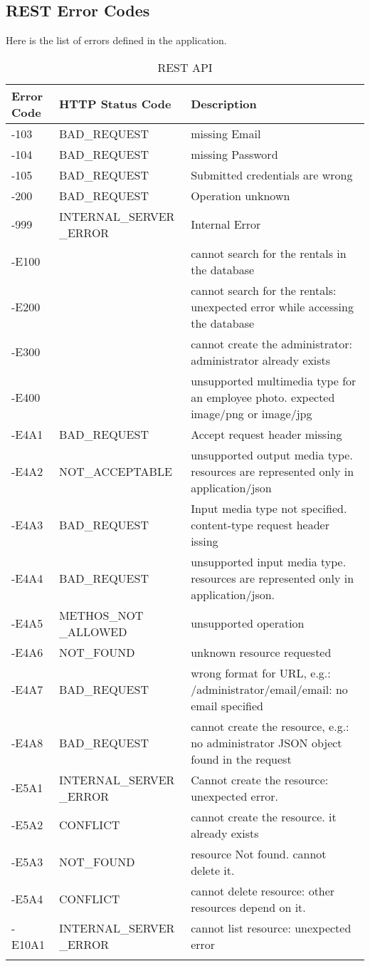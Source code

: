 \subsection{REST Error Codes}

Here is the list of errors defined in the application.


\begin{longtable}{|p{}|p{} |p{}|} 
\hline
\textbf{Error Code} & \textbf{HTTP Status Code} & \textbf{Description} \\\hline

-103 & BAD\_REQUEST &   missing Email\\\hline
-104 & BAD\_REQUEST &   missing Password \\\hline
-105 & BAD\_REQUEST &  Submitted credentials are wrong \\\hline
-200 & BAD\_REQUEST &  Operation unknown \\\hline
-999 & INTERNAL\_SERVER
\_ERROR &  Internal Error \\\hline
-E100 &  &  cannot search for the rentals in the database\\\hline
-E200 &  &  cannot search for the rentals: unexpected error while accessing the database\\\hline
-E300 &   & cannot create the administrator: administrator already exists\\\hline
-E400 &  &  unsupported multimedia type for an employee photo. expected image/png or image/jpg\\\hline
-E4A1 & BAD\_REQUEST &  Accept request header missing\\\hline
-E4A2 & NOT\_ACCEPTABLE &  unsupported output media type. resources are represented only in application/json\\\hline
-E4A3 & BAD\_REQUEST &  Input media type not specified. content-type request header issing\\\hline
-E4A4 & BAD\_REQUEST &  unsupported input media type. resources are represented only in application/json.\\\hline
-E4A5 & METHOS\_NOT
\_ALLOWED  &  unsupported operation\\\hline
-E4A6 & NOT\_FOUND &  unknown resource requested\\\hline
-E4A7 & BAD\_REQUEST &  wrong format for URL, e.g.: /administrator/email/{email}: no {email} specified\\\hline
-E4A8 &  BAD\_REQUEST &  cannot create the resource, e.g.: no administrator JSON object found in the request\\\hline
-E5A1 & INTERNAL\_SERVER
\_ERROR   & Cannot create the resource: unexpected error.\\\hline
-E5A2 & CONFLICT  &  cannot create the resource. it already exists\\\hline
-E5A3 & NOT\_FOUND  &  resource Not found. cannot delete it.\\\hline
-E5A4 & CONFLICT &   cannot delete resource: other resources depend on it.\\\hline
-E10A1 & INTERNAL\_SERVER
\_ERROR &  cannot list resource: unexpected error
\\\hline


\caption{ REST API}
\label{tab:termGlossary}
\end{longtable}
